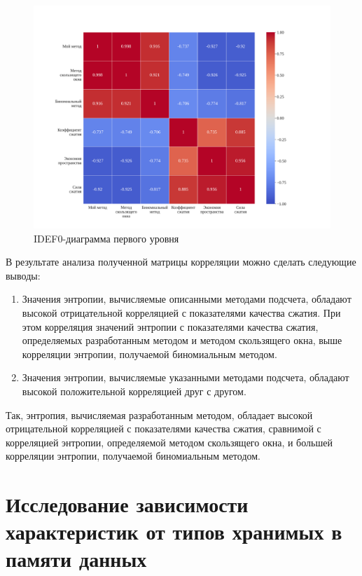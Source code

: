 \begin{figure}[H]
	\begin{center}
		\includegraphics[scale=0.4]{inc/img/correlation-matrix.pdf}
	\end{center}
	\captionsetup{justification=centering}
	\caption{IDEF0-диаграмма первого уровня}
	\label{img:correlation-matrix}
\end{figure}

В результате анализа полученной матрицы корреляции можно сделать следующие выводы:

\begin{enumerate}
    \item Значения энтропии, вычисляемые описанными методами подсчета, обладают высокой отрицательной корреляцией с показателями качества сжатия. При этом корреляция значений энтропии с показателями качества сжатия, определяемых разработанным методом и методом скользящего окна, выше корреляции энтропии, получаемой биномиальным методом.
    \item Значения энтропии, вычисляемые указанными методами подсчета, обладают высокой положительной корреляцией друг с другом.
\end{enumerate}

Так, энтропия, вычисляемая разработанным методом, обладает высокой отрицательной корреляцией с показателями качества сжатия, сравнимой с корреляцией энтропии, определяемой методом скользящего окна, и большей корреляции энтропии, получаемой биномиальным методом.

\section{Исследование зависимости характеристик от типов хранимых в памяти данных}

